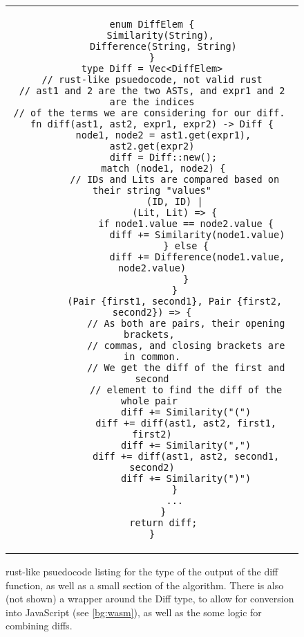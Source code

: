 \begin{figure}[t]
    \begin{tabular}{c}
    \begin{lstlisting}[language=Rust_boxed]
enum DiffElem {
    Similarity(String), 
    Difference(String, String)
}
type Diff = Vec<DiffElem>
// rust-like psuedocode, not valid rust
// ast1 and 2 are the two ASTs, and expr1 and 2 are the indices
// of the terms we are considering for our diff. 
fn diff(ast1, ast2, expr1, expr2) -> Diff {
    node1, node2 = ast1.get(expr1), ast2.get(expr2)
    diff = Diff::new();
    match (node1, node2) {
        // IDs and Lits are compared based on their string "values"
        (ID, ID) |
        (Lit, Lit) => {
            if node1.value == node2.value {
                diff += Similarity(node1.value)
            } else {
                diff += Difference(node1.value, node2.value)
            }
        }
        (Pair {first1, second1}, Pair {first2, second2}) => {
            // As both are pairs, their opening brackets, 
            // commas, and closing brackets are in common.
            // We get the diff of the first and second
            // element to find the diff of the whole pair 
            diff += Similarity("(")
            diff += diff(ast1, ast2, first1, first2)
            diff += Similarity(",")
            diff += diff(ast1, ast2, second1, second2)
            diff += Similarity(")")
        }
        ...
    }
    return diff;
}
    \end{lstlisting}
    \end{tabular}
    \caption{rust-like psuedocode listing for the type of the output of the diff function, as well as a small section of the algorithm. There is also (not shown) a wrapper around the Diff type, to allow for conversion into JavaScript (see \ref{bg:wasm}), as well as the some logic for combining diffs.}
    \label{fig:diff_list}
\end{figure}